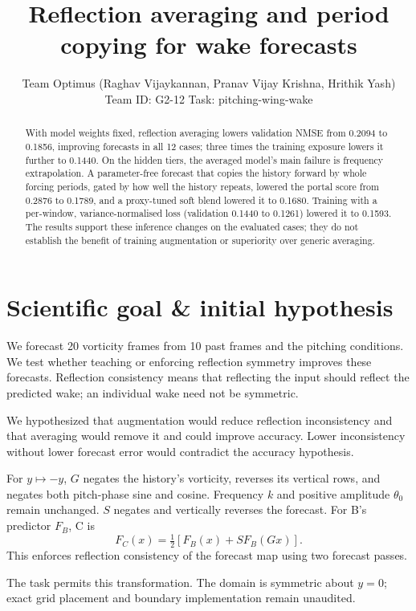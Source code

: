 \documentclass{article}
\title{Reflection averaging and period copying for wake forecasts}
\author{
  Team Optimus (Raghav Vijaykannan, Pranav Vijay Krishna, Hrithik Yash)\\
  Team ID: G2-12 \quad Task: pitching-wing-wake
}
\begin{document}
\maketitle

\begin{abstract}
With model weights fixed, reflection averaging lowers validation NMSE
from 0.2094 to 0.1856, improving forecasts in all 12 cases; three times
the training exposure lowers it further to 0.1440.
On the hidden tiers, the averaged model's main failure is frequency
extrapolation. A parameter-free forecast that copies the history forward
by whole forcing periods, gated by how well the history repeats,
lowered the portal score from 0.2876 to 0.1789, and a proxy-tuned soft
blend lowered it to 0.1680. Training with a per-window, variance-normalised
loss (validation 0.1440 to 0.1261) lowered it to 0.1593.
The results support these inference changes on the evaluated cases;
they do not establish the benefit of training augmentation or
superiority over generic averaging.
\end{abstract}

\section{Scientific goal \& initial hypothesis}

We forecast 20 vorticity frames from 10 past frames and the pitching
conditions. We test whether teaching or enforcing reflection symmetry
improves these forecasts. Reflection consistency means that reflecting
the input should reflect the predicted wake; an individual wake need
not be symmetric.

We hypothesized that augmentation would reduce reflection inconsistency
and that averaging would remove it and could improve accuracy.
Lower inconsistency without lower forecast error would contradict
the accuracy hypothesis.

For $y\mapsto-y$, $G$ negates the history's vorticity, reverses its
vertical rows, and negates both pitch-phase sine and cosine.
Frequency $k$ and positive amplitude $\theta_0$ remain unchanged.
$S$ negates and vertically reverses the forecast.
For B's predictor $F_B$, C is
\begin{equation}
F_C(x)=\tfrac12\left[F_B(x)+S F_B(Gx)\right].
\end{equation}
This enforces reflection consistency of the forecast map using two
forecast passes.

The task permits this transformation. The domain is symmetric about
$y=0$; exact grid placement and boundary implementation remain
unaudited.
\end{document}
